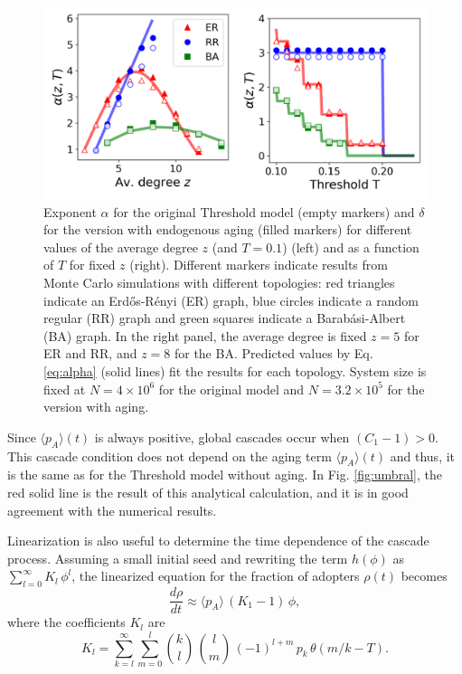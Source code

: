 \begin{figure}
    \includegraphics[width=\columnwidth]{Figs/Aging_Threshold/ENDO.pdf}
    \caption[Exponent for the Threshold model]{\label{fig:endo_exp} Exponent $\alpha$ for the original Threshold model (empty markers) and $\delta$ for the version with endogenous aging (filled markers) for different values of the average degree $z$ (and $T = 0.1$) (left) and as a function of $T$ for fixed $z$ (right). Different markers indicate results from Monte Carlo simulations with different topologies: red triangles indicate an Erd\H{o}s-R\'enyi (ER) graph, blue circles indicate a random regular (RR) graph and green squares indicate a Barab\'asi-Albert (BA) graph. In the right panel, the average degree is fixed $z = 5$ for ER and RR, and $z = 8$ for the BA. Predicted values by Eq. \eqref{eq:alpha} (solid lines) fit the results for each topology. System size is fixed at $N = 4 \times 10^6$ for the original model and $N = 3.2 \times 10^5$ for the version with aging.}
\end{figure}

Since $\langle p_A \rangle(t)$ is always positive, global cascades occur when $( C_1 - 1) > 0 $. This cascade condition does not depend on the aging term $\langle p_A \rangle(t)$ and thus, it is the same as for the Threshold model without aging. In Fig. \ref{fig:umbral}, the red solid line is the result of this analytical calculation, and it is in good agreement with the numerical results. 


Linearization is also useful to determine the time dependence of the cascade process.  Assuming a small initial seed and rewriting the term $h(\phi)$ as  $ \sum_{l=0}^{\infty} K_l\,  \phi^l $, the linearized equation for the fraction of adopters $\rho(t)$ becomes
\begin{equation}
    \label{eq:linear_r}
    \frac{d \rho}{dt} \approx  \langle p_A \rangle\,  ( K_1 -1)\, \phi,
\end{equation}
where the coefficients $K_l$ are
\begin{equation}
    \label{eq:coef_rho}
    K_l = \sum_{k=l}^{\infty} \sum_{m=0}^{l} { k \choose l} \, {l \choose m} \, (-1)^{l+m}\,  p_k \, \theta\left( m/k - T \right).
\end{equation}

